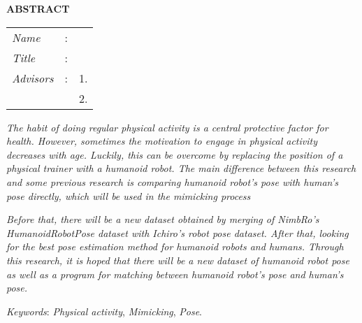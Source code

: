 \begin{center}
  \large\textbf{ABSTRACT}
\end{center}


\vspace{2ex}

\begingroup
\setlength{\tabcolsep}{0pt}

\noindent
\begin{tabularx}{\textwidth}{l >{\centering}m{3em} X}
  \emph{Name}     & : & \name{}         \\

  \emph{Title}    & : & \engtatitle{}   \\

  \emph{Advisors} & : & 1. \advisor{}   \\
                  &   & 2. \coadvisor{} \\
\end{tabularx}
\endgroup

\emph{The habit of doing regular physical activity is a central protective factor for health.
However, sometimes the motivation to engage in physical activity decreases with age.
Luckily, this can be overcome by replacing the position of a physical trainer with a humanoid robot.
The main difference between this research and some previous research is comparing humanoid robot's pose with human's pose directly, 
which will be used in the mimicking process}

\emph{Before that, there will be a new dataset obtained by merging of NimbRo's HumanoidRobotPose dataset with Ichiro's robot pose dataset.
After that, looking for the best pose estimation method for humanoid robots and humans.
Through this research, it is hoped that there will be a new dataset of humanoid robot pose as well as a program for matching between humanoid robot's pose and human's pose.}

\emph{Keywords}: \emph{Physical activity}, \emph{Mimicking}, \emph{Pose}.
